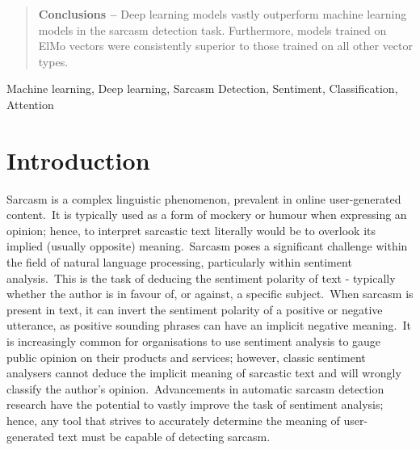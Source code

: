 \documentclass[12pt,a4paper]{article}
\begin{document}
\begin{abstract}

\noindent \textbf{Conclusions --} Deep learning models vastly outperform machine learning models in the sarcasm detection task. Furthermore, models trained on ElMo vectors were consistently superior to those trained on all other vector types.

\end{abstract}\vspace{-10pt}

\begin{keywords}
Machine learning, Deep learning, Sarcasm Detection, Sentiment, Classification, Attention
\end{keywords}\vspace{-15pt}

\section{Introduction}\vspace{-4.2pt}
\noindent Sarcasm is a complex linguistic phenomenon, prevalent in online user-generated content.\ It is typically used as a form of mockery or humour when expressing an opinion; hence, to interpret sarcastic text literally would be to overlook its implied (usually opposite) meaning.\ Sarcasm poses a significant challenge within the field of natural language processing, particularly within sentiment analysis.\ This is the task of deducing the sentiment polarity of text - typically whether the author is in favour of, or against, a specific subject.\ When sarcasm is present in text, it can invert the sentiment polarity of a positive or negative utterance, as positive sounding phrases can have an implicit negative meaning.\ It is increasingly common for organisations to use sentiment analysis to gauge public opinion on their products and services; however, classic sentiment analysers cannot deduce the implicit meaning of sarcastic text and will wrongly classify the author's opinion.\ Advancements in automatic sarcasm detection research have the potential to vastly improve the task of sentiment analysis; hence, any tool that strives to accurately determine the meaning of user-generated text must be capable of detecting sarcasm.
\end{document}
